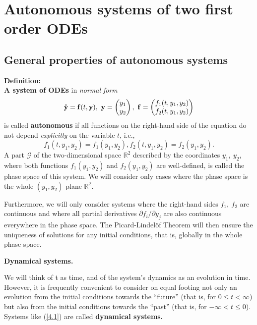 \documentclass[11pt,a4paper,twoside]{article}
\begin{document}
	\mytitle
	\section{Autonomous systems of two first order ODEs}
	\subsection{ General properties of autonomous systems}
	\textbf{Definition:}\\
	\textbf{A system of ODEs} in \textit{normal form}
	\begin{equation}\label{4.1}
		\vb{\dot{y}} = \vb{f}(t,\vb{y}),\ 
		\vb{y}=
		\begin{pmatrix}
			y_1\\
			y_2
		\end{pmatrix},\ 
		\vb{f} =
		\begin{pmatrix}
			f_1(t,y_1,y_2)\\
			f_2(t,y_1,y_2)
		\end{pmatrix}
	\end{equation}
	is called \textbf{autonomous} if all functions on the right-hand side of the equation do not depend \textit{explicitly} on the variable $t$, i.e.,
	\begin{equation}\label{4.2}
		f_1(t, y_1, y_2) = f_1(y_1, y_2) , f_2(t, y_1, y_2) = f_2(y_1, y_2). 
	\end{equation}
	A part $\mathcal{G}$ of the two-dimensional space $\mathbb{R}^2$ described by the coordinates $y_1,\ y_2$, where both functions $f_1(y_1, y_2)$ and $f_2(y_1, y_2)$ are well-defined, is called the phase space of this system. We will consider only cases where the phase space is the whole $(y_1, y_2)$ plane $\mathbb{R^2}$.\par
	Furthermore, we will only consider systems where the right-hand sides $f_1,\ f_2$ are continuous and where all partial derivatives $\partial f_i/\partial y_j$ are also continuous everywhere in the phase space. The Picard-Lindel\"{o}f Theorem will then ensure the uniqueness of solutions for any initial conditions, that is, globally in the whole phase space.\par
	\textbf{Dynamical systems.}\par
	We will think of t as time, and of the system’s dynamics as an evolution in time. However, it is frequently convenient to consider on equal footing not only an evolution from the initial conditions towards the “future” (that is, for $0 \leq t < \infty$) but also from the initial conditions towards the “past” (that is, for $-\infty < t \leq 0$). Systems like (\ref{4.1})  are called \textbf{dynamical systems.}\par
\end{document}

